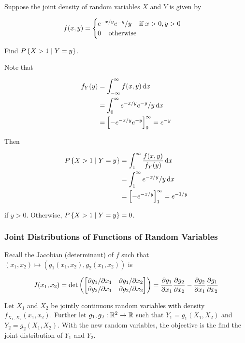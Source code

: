 \documentclass[a4paper,12pt]{article}
\begin{document}
\begin{exm}
  Suppose the joint density of random variables $X$ and $Y$ is given by

  $$f(x,y)=\begin{cases}
    e^{-x/y}e^{-y}/y\;\;\;\;\text{if }x>0,y>0\\
    0\;\;\;\;\text{otherwise}
  \end{cases}$$\s

  Find $P\left\{ X>1\mid Y=y\right\}$.\n

  \ans Note that

  $$\begin{aligned}[t]
    f_{Y}(y)&=\int_{-\infty}^{\infty}f(x,y)\,\mathrm{d} x\\
    &=\int_{0}^{\infty}e^{-x/y}e^{-y}/y\,\mathrm{d} x\\
    &=\left[ -e^{-x/y}e^{-y}\right]_{0}^{\infty}=e^{-y}
  \end{aligned}$$\s

  Then

  $$\begin{aligned}[t]
    P\left\{ X>1\mid Y=y\right\}&=\int_{1}^{\infty}\frac{f(x,y)}{f_{Y}(y)}\,\mathrm{d} x\\
    &=\int_{1}^{\infty}e^{-x/y}/y\,\mathrm{d} x\\
    &=\left[ -e^{-x/y}\right]_{1}^{\infty}=e^{-1/y}
  \end{aligned}$$\s

  if $y>0$. Otherwise, $P\left\{ X>1\mid Y=y\right\}=0$.
\end{exm}

\subsubsection{Joint Distributions of Functions of Random Variables}
Recall the Jacobian (determinant) of $f$ such that $(x_{1},x_{2})\mapsto(g_{1}(x_{1},x_{2}),g_{2}(x_{1},x_{2}))$ is

$$J(x_{1},x_{2})=\det\left( \begin{bmatrix}
  \partial g_{1}/\partial x_{1} & \partial g_{1}/\partial x_{2}\\
  \partial g_{2}/\partial x_{1} & \partial g_{2}/\partial x_{2}
\end{bmatrix}\right)=\frac{\partial g_{1}}{\partial x_{1}}\frac{\partial g_{2}}{\partial x_{2}}-\frac{\partial g_{2}}{\partial x_{1}}\frac{\partial g_{1}}{\partial x_{2}}$$\s

Let $X_{1}$ and $X_{2}$ be jointly continuous random variables with density $f_{X_{1},X_{2}}(x_{1},x_{2})$. Further let $g_{1},g_{2}:\mathbb{R}^{2}\to\mathbb{R}$ such that $Y_{1}=g_{1}(X_{1},X_{2})$ and $Y_{2}=g_{2}(X_{1},X_{2})$. With the new random variables, the objective is the find the joint distribution of $Y_{1}$ and $Y_{2}$.\n
\end{document}

